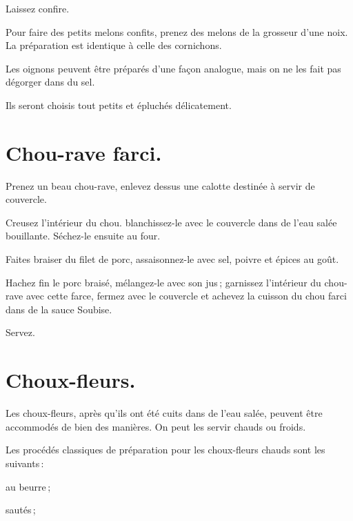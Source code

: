Laissez confire.

\sk

Pour faire des petits melons confits, prenez des melons de la grosseur d'une
noix. La préparation est identique à celle des cornichons.

\sk

Les oignons peuvent être préparés d'une façon analogue, mais on ne les fait pas
dégorger dans du sel.

Ils seront choisis tout petits et épluchés délicatement.

\section*{\centering Chou-rave farci.}
{}

Prenez un beau chou-rave, enlevez dessus une calotte destinée à servir de
couvercle.

Creusez l'intérieur du chou. blanchissez-le avec le couvercle dans de l'eau
salée bouillante. Séchez-le ensuite au four.

Faites braiser du filet de porc, assaisonnez-le avec sel, poivre et épices au goût.

Hachez fin le porc braisé, mélangez-le avec son jus ; garnissez l'intérieur du
chou-rave avec cette farce, fermez avec le couvercle et achevez la cuisson du
chou farci dans de la sauce Soubise.

Servez.

\section*{\centering Choux-fleurs.}
{}

Les choux-fleurs, après qu'ils ont été cuits dans de l’eau salée, peuvent être
accommodés de bien des manières. On peut les servir chauds ou froids.

Les procédés classiques de préparation pour les choux-fleurs chauds sont les
suivants :

au beurre ;

sautés ;

